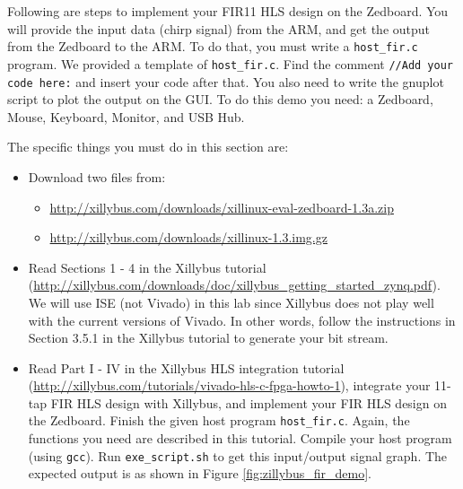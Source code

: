 Following are steps to implement your FIR11 HLS design on the Zedboard. You will provide the input data (chirp signal) from the ARM, and get the output from the Zedboard to the ARM. To do that, you must write a \texttt{host\_fir.c} program. We provided a template of \texttt{host\_fir.c}. Find the comment \texttt{//Add your code here:} and insert your code after that. You also need to write the gnuplot script to plot the output on the GUI. To do this demo you need: a Zedboard, Mouse, Keyboard, Monitor, and USB Hub.

The specific things you must do in this section are:
\begin{itemize}
\item Download two files from: 
\begin{itemize}
\item \url{http://xillybus.com/downloads/xillinux-eval-zedboard-1.3a.zip}
\item \url{http://xillybus.com/downloads/xillinux-1.3.img.gz}
\end{itemize}
\item Read Sections 1 - 4 in the Xillybus tutorial (\url{http://xillybus.com/downloads/doc/xillybus_getting_started_zynq.pdf}). We will use ISE (not Vivado) in this lab since Xillybus does not play well with the current versions of Vivado.  In other words, follow the instructions in Section 3.5.1 in the Xillybus tutorial to generate your bit stream.
\item Read Part I - IV in the Xillybus HLS integration tutorial (\url{http://xillybus.com/tutorials/vivado-hls-c-fpga-howto-1}), integrate your 11-tap FIR HLS design with Xillybus, and
implement your FIR HLS design on the Zedboard. Finish the given host program \texttt{host\_fir.c}. Again, the functions you need are described in this tutorial. Compile your host program (using \texttt{gcc}). Run \texttt{exe\_script.sh} to get this input/output signal graph. The expected output is as shown in Figure \ref{fig:zillybus_fir_demo}.
\end{itemize}

